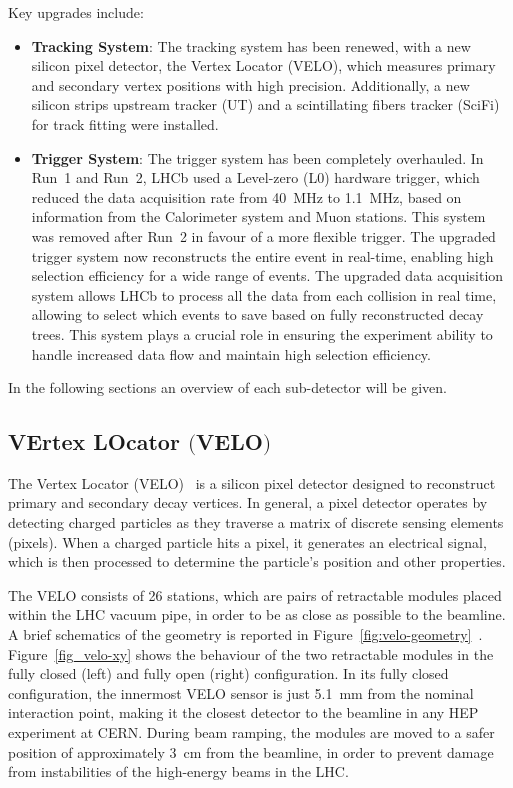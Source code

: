 Key upgrades include:
\begin{itemize}
\item \textbf{Tracking System}: The tracking system has been renewed, with a new silicon pixel detector, the Vertex Locator (VELO), which measures primary and secondary vertex positions with high precision. Additionally, a new silicon strips upstream tracker (UT) and a scintillating fibers tracker (SciFi) for track fitting were installed.

\item \textbf{Trigger System}: The trigger system has been completely overhauled. In Run~1 and Run~2, LHCb used a Level-zero (L$0$) hardware trigger, which reduced the data acquisition rate from \SI{40}{\mega\hertz} to \SI{1.1}{\mega\hertz}, based on information from the Calorimeter system and Muon stations. This system was removed after Run~2 in favour of a more flexible trigger. The upgraded trigger system now reconstructs the entire event in real-time, enabling high selection efficiency for a wide range of events. The upgraded data acquisition system allows LHCb to process all the data from each collision in real time, allowing to select which events to save based on fully reconstructed decay trees. This system plays a crucial role in ensuring the experiment ability to handle increased data flow and maintain high selection efficiency.
\end{itemize}
In the following sections an overview of each sub-detector will be given.

\subsection[VErtex LOcator]{VErtex LOcator $\bigl($VELO$\bigr)$}\label{sec:velo}
The Vertex Locator (VELO)~\cite{Bediaga:2013tje} is a silicon pixel detector designed to reconstruct primary and secondary decay vertices. In general, a pixel detector operates by detecting charged particles as they traverse a matrix of discrete sensing elements (pixels). When a charged particle hits a pixel, it generates an electrical signal, which is then processed to determine the particle's position and other properties.  

The VELO consists of 26 stations, which are pairs of retractable modules placed within the LHC vacuum pipe, in order to be as close as possible to the beamline. 
A brief schematics of the geometry is reported in Figure~\ref{fig:velo-geometry}~\cite{LHCbVelo:2019flq}. Figure~\ref{fig_velo-xy} shows the behaviour of the two retractable modules in the fully closed (left) and fully open (right) configuration. In its fully closed configuration, the innermost VELO sensor is just \SI{5.1}{\milli\meter} from the nominal interaction point, making it the closest detector to the beamline in any HEP experiment at CERN. During beam ramping, the modules are moved to a safer position of approximately \SI{3}{\centi\meter} from the beamline, in order to prevent damage from instabilities of the high-energy beams in the LHC.


